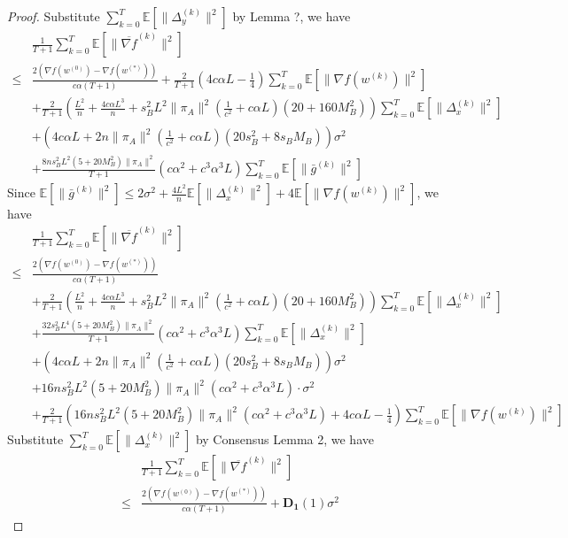 \documentclass{article}
\newcommand{\EE}[1]{\mathbb{E}\left[#1\right]}
\newcommand{\norm}[1]{\| #1 \|}
\begin{document}
\begin{proof}
  Substitute $\sum_{k=0}^T \EE{\norm{\Delta_y^{(k)}}^2}$ by Lemma ?, we have
  \begin{align*}
    &\frac{1}{T+1}\sum_{k=0}^T\EE{\norm{\overline{\nabla f}^{(k)}}^2}\\ \leq& \frac{2(\nabla f(w^{(0)})-\nabla f(w^{(*)}))}{c\alpha(T+1)}+\frac{2}{T+1}\left(4c\alpha L-\frac{1}{4}\right)\sum_{k=0}^T\EE{\norm{\nabla f(w^{(k)})}^2}
    \\&+\frac{2}{T+1}\left(\frac{L^2}{n}+\frac{4c\alpha L^3}{n}+s_B^2L^2\norm{\pi_A}^2\left(\frac{1}{c^2}+c\alpha L\right)(20+160M_B^2)\right)\sum_{k=0}^T\EE{\norm{\Delta_x^{(k)}}^2}
    \\&+\left(4c\alpha L+2n\norm{\pi_A}^2\left(\frac{1}{c^2}+c\alpha L\right)(20s_B^2+8s_BM_B)\right)\sigma^2
    \\&+\frac{8ns_B^2L^2(5+20M_B^2)\norm{\pi_A}^2}{T+1}\left(c\alpha^2+c^3\alpha^3 L\right)\sum_{k=0}^T\EE{\norm{\bar{g}^{(k)}}^2}
  \end{align*}
  Since $\EE{\norm{\bar{g}^{(k)}}^2}\leq 2\sigma^2+\frac{4L^2}{n}\EE{\norm{\Delta_x^{(k)}}^2}+4\EE{\norm{\nabla f(w^{(k)})}^2}$, we have
  \begin{align*}
    &\frac{1}{T+1}\sum_{k=0}^T\EE{\norm{\overline{\nabla f}^{(k)}}^2}\\ \leq& \frac{2(\nabla f(w^{(0)})-\nabla f(w^{(*)}))}{c\alpha(T+1)}
    \\&+\frac{2}{T+1}\left(\frac{L^2}{n}+\frac{4c\alpha L^3}{n}+s_B^2L^2\norm{\pi_A}^2\left(\frac{1}{c^2}+c\alpha L\right)(20+160M_B^2)\right)\sum_{k=0}^T\EE{\norm{\Delta_x^{(k)}}^2}
    \\&+\frac{32s_B^2L^4(5+20M_B^2)\norm{\pi_A}^2}{T+1}\left(c\alpha^2+c^3\alpha^3 L\right)\sum_{k=0}^T\EE{\norm{\Delta_x^{(k)}}^2}
    \\&+\left(4c\alpha L+2n\norm{\pi_A}^2\left(\frac{1}{c^2}+c\alpha L\right)(20s_B^2+8s_BM_B)\right)\sigma^2
    \\&+16ns_B^2L^2(5+20M_B^2)\norm{\pi_A}^2\left(c\alpha^2+c^3\alpha^3 L\right)\cdot\sigma^2
    \\&+\frac{2}{T+1}\left(16ns_B^2L^2(5+20M_B^2)\norm{\pi_A}^2\left(c\alpha^2+c^3\alpha^3 L\right)+4c\alpha L-\frac{1}{4}\right)\sum_{k=0}^T\EE{\norm{\nabla f(w^{(k)})}^2}
  \end{align*}
  Substitute $\sum_{k=0}^T \EE{\norm{\Delta_x^{(k)}}^2}$ by Consensus Lemma 2, we have
  \begin{align*}
    &\frac{1}{T+1}\sum_{k=0}^T\EE{\norm{\overline{\nabla f}^{(k)}}^2}\\ \leq& \frac{2(\nabla f(w^{(0)})-\nabla f(w^{(*)}))}{c\alpha(T+1)}+\mathbf{D_1}(1)\sigma^2

\end{align*}
\end{proof}
\end{document}
